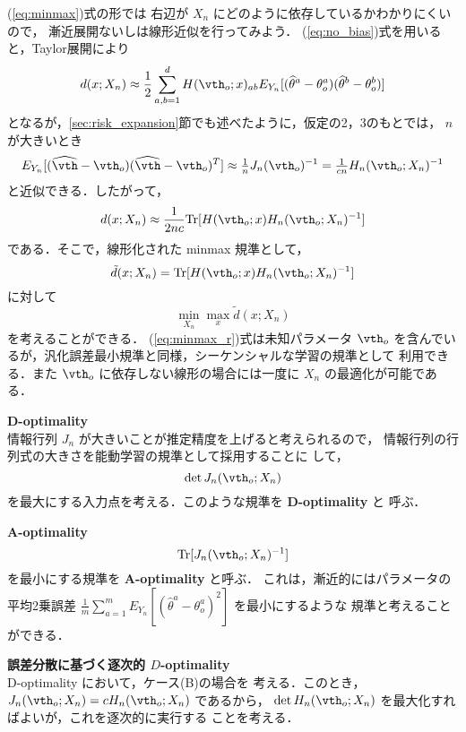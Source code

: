 \documentclass[master]{cimt}
\newcommand{\hvth}{\widehat{{\vth}}}
\newcommand{\trace}{\text{Tr}}
\begin{document}
(\ref{eq:minmax})式の形では
右辺が $X_n$ にどのように依存しているかわかりにくいので，
漸近展開ないしは線形近似を行ってみよう．
(\ref{eq:no_bias})式を用いると，Taylor展開により
\[
d(x; X_n) \approx \frac{1}{2} \sum_{a,b=1}^d 
	H(\vth_o; x)_{ab}
	E_{Y_n}[ (\widehat{\theta}^a - \theta_o^a)
	(\widehat{\theta}^b - \theta_o^b)]
\]
となるが，\ref{sec:risk_expansion}節でも述べたように，仮定の2，3のもとでは，
$n$ が大きいとき 
\[
	E_{Y_n}[ (\hvth - \vth_o)(\hvth - \vth_o)^T] \approx 
	\tfrac{1}{n} J_n(\vth_o)^{-1} = \tfrac{1}{cn} H_n(\vth_o; X_n)^{-1} 
\]
と近似できる．したがって，
\begin{equation}
	d(x; X_n) \approx \frac{1}{2nc} \trace [ 
		H(\vth_o; x ) H_n(\vth_o; X_n)^{-1} ]
\end{equation}
である．そこで，線形化された minmax 規準として，
\begin{equation}
\label{eq:lin_d}
\tilde{d}(x; X_n) = \trace[ H( \vth_o;x) H_n(\vth_o; X_n)^{-1} ]
\end{equation}
に対して
\begin{equation}
\label{eq:minmax_r}
	\min_{X_n} \max_{x} \tilde{d}(x; X_n)
\end{equation}
を考えることができる．
(\ref{eq:minmax_r})式は未知パラメータ $\vth_o$ 
を含んでいるが，汎化誤差最小規準と同様，シーケンシャルな学習の規準として
利用できる．また $\vth_o$ に依存しない線形の場合には一度に
$X_n$ の最適化が可能である．

\bigskip
\noindent
{\bf D-optimality}\\
情報行列 $J_n$ が大きいことが推定精度を上げると考えられるので，
情報行列の行列式の大きさを能動学習の規準として採用することに
して，
\begin{equation}
\label{eq:D_opt}
	\det J_n(\vth_o; X_n)
\end{equation}
を最大にする入力点を考える．このような規準を {\bf D-optimality} と
呼ぶ．


\bigskip
\noindent
{\bf A-optimality}
\begin{equation}
	\trace [ J_n(\vth_o; X_n)^{-1} ]
\end{equation}
を最小にする規準を {\bf A-optimality} と呼ぶ．
これは，漸近的にはパラメータの平均2乗誤差 $\frac{1}{m} 
\sum_{a=1}^m E_{Y_n} [ ( \hat{\theta}^a - \theta^a_o )^2 ] $ を最小にするような
規準と考えることができる．


\bigskip
\noindent
{\bf 誤差分散に基づく逐次的 $D$-optimality}\\
D-optimality において，ケース(B)の場合を
考える．このとき，$J_n(\vth_o;X_n) = c H_n(\vth_o; X_n)$ であるから，
$\det H_n(\vth_o; X_n)$ を最大化すればよいが，これを逐次的に実行する
ことを考える．
\end{document}

